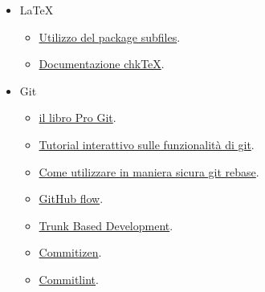 \documentclass[../norme-di-progetto.tex]{subfiles}
\begin{document}
\begin{itemize}
  \item \LaTeX{}
        \begin{itemize}
          \item \href{https://www.overleaf.com/learn/latex/Multi-file_LaTeX_projects#The_subfiles_package}{Utilizzo del package subfiles}.
          \item \href{https://www.nongnu.org/chktex/ChkTeX.pdf}{Documentazione chk\TeX}.
        \end{itemize}

  \item Git
        \begin{itemize}
          \item \href{https://git-scm.com/book/en/v2}{il libro Pro Git}.
          \item \href{https://learngitbranching.js.org/}{Tutorial interattivo sulle funzionalità di git}.
          \item \href{https://git-scm.com/book/en/v2/Git-Branching-Rebasing}{Come utilizzare in maniera sicura git rebase}.
          \item \href{https://guides.github.com/introduction/flow/}{GitHub flow}.
          \item \href{https://trunkbaseddevelopment.com/}{Trunk Based Development}.
          \item \href{https://commitizen.github.io/cz-cli/}{Commitizen}.
          \item \href{https://commitlint.js.org/}{Commitlint}.
        \end{itemize}


\end{itemize}
\end{document}
